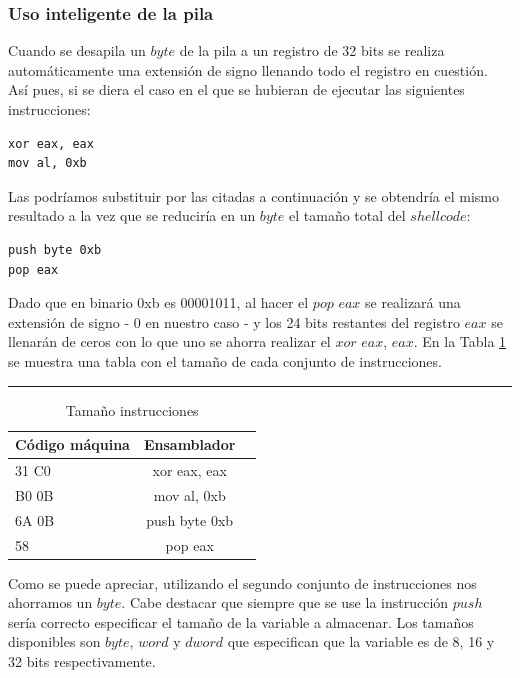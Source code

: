 \documentclass [titlepage, 12pt]{article}
\newcommand{\topfigrule}{\hrule\vspace{4 pt}}
\begin{document}
\subsubsection{Uso inteligente de la pila}

Cuando se desapila un $byte$ de la pila a un registro de 32 bits se realiza autom\'aticamente una extensi\'on de signo llenando todo el registro en cuesti\'on. As\'i pues, si se diera el caso en el que se hubieran de ejecutar las siguientes instrucciones:
\begin{verbatim}
xor eax, eax
mov al, 0xb
\end{verbatim}
Las podr\'iamos substituir por las citadas a continuaci\'on y se obtendr\'ia el mismo resultado a la vez que se reducir\'ia en un $byte$ el tama\~no total del $shellcode$:
\begin{verbatim}
push byte 0xb
pop eax
\end{verbatim}

Dado que en binario 0xb es 00001011, al hacer el $pop$ $eax$ se realizar\'a una extensi\'on de signo - 0 en nuestro caso - y los 24 bits restantes del registro $eax$ se llenar\'an de ceros con lo que uno se ahorra realizar el $xor$ $eax$, $eax$. En la Tabla \ref{tab:equivalencias4} se muestra una tabla con el tama\~no de cada conjunto de instrucciones.\bigskip

\begin{table}[!htp]
	\topfigrule
   	\addtolength{\abovecaptionskip}{-12pt}   	
   	\caption{Tama\~no instrucciones}
   	\label{tab:equivalencias4} 	
	\begin{center}
		\begin{tabular}{||l | c | r||}
			\hline
			\hline
			C\'odigo m\'aquina & Ensamblador \\
			\hline
			31 C0 & xor eax, eax\\
			\hline
			B0 0B & mov al, 0xb\\
			\hline
			\hline
			6A 0B & push byte 0xb\\
			\hline
			58 & pop eax\\
			\hline
		\end{tabular}
	\end{center} 
\end{table}

Como se puede apreciar, utilizando el segundo conjunto de instrucciones nos ahorramos un $byte$. Cabe destacar que siempre que se use la instrucci\'on $push$ ser\'ia correcto especificar el tama\~no de la variable a almacenar. Los tama\~nos disponibles son $byte$, $word$ y $dword$ que especifican que la variable es de 8, 16 y 32 bits respectivamente. \pagebreak
\end{document}
